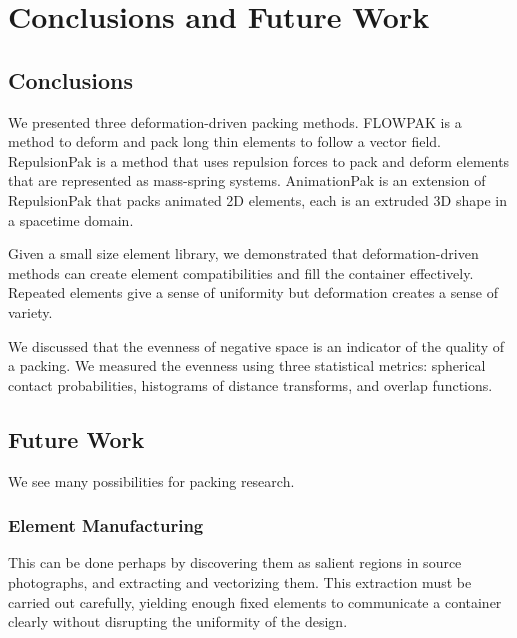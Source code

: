 
\chapter{Conclusions and Future Work}
\label{chapter_conclusions_and_future_work}

\section{Conclusions}

\newtext
{
We presented three deformation-driven packing methods.
FLOWPAK is a method to deform and pack long thin elements to follow a vector field.
RepulsionPak is a method that uses repulsion forces to pack and deform
elements that are represented as mass-spring systems.
AnimationPak is an extension of RepulsionPak that packs animated 2D elements,
each is an extruded 3D shape in a spacetime domain.
}

\newtext
{
Given a small size element library, 
we demonstrated that deformation-driven methods can create element compatibilities
and fill the container effectively.
Repeated elements give a sense of uniformity but deformation creates a sense of variety.
}

\newtext
{
We discussed that the evenness of negative space is an indicator of the quality of a packing.
We measured the evenness using three statistical metrics:
spherical contact probabilities, histograms of distance transforms, and overlap functions.
}

\section{Future Work}

\newtext
{
We see many possibilities for packing research.
}


\subsection{Element Manufacturing}

This can be done perhaps by discovering them as salient regions 
in source photographs, and extracting and vectorizing them.  This 
extraction must be carried out carefully, yielding enough fixed elements
to communicate a container clearly without disrupting the uniformity of
the design.


